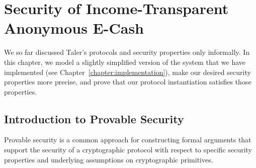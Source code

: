 \chapter{Security of Income-Transparent Anonymous E-Cash}\label{chapter:security}

\def\Z{\mathbb{Z}}

\def\mathperiod{.}
\def\mathcomma{,}

\newcommand*\ST[5]%
{\left#1\,#4\vphantom{#5} \;\right#2 \left. #5 \vphantom{#4}\,\right#3}

\newcommand{\randsel}[0]{\ensuremath{\xleftarrow{\text{\$}}}}

\newcommand{\Exp}[1]{\ensuremath{E\left[#1\right]}}

\newcommand{\ora}[1]{\ensuremath{\mathcal{O}\mathsf{#1}}}
\newcommand{\oraSet}[1]{\ensuremath{\mathcal{O}\textsc{#1}}}
\newcommand{\algo}[1]{\ensuremath{\mathsf{#1}}}
\newcommand{\prt}[1]{\ensuremath{\mathcal{#1}}}
\let\V\relax %
\newcommand{\V}[1]{\ensuremath{\mathsf{#1}}}

\newcommand{\Prb}[1]{\ensuremath{\Pr\left [#1 \right ]}}

\newcommand{\mycomment}[1]{~\\ {\small \textcolor{blue}{({#1})}}}

\theoremstyle{definition}
\newtheorem{definition}{Definition}[section]
\theoremstyle{corollary}
\newtheorem{corollary}{Corollary}[section]


% 

We so far discussed Taler's protocols and security properties only informally.
In this chapter, we model a slightly simplified version of the system that we
have implemented (see Chapter~\ref{chapter:implementation}), make our desired
security properties more precise, and prove that our protocol instantiation
satisfies those properties.

\section{Introduction to Provable Security}
Provable security
\cite{goldwasser1982probabilistic,pointcheval2005provable,shoup2004sequences,coron2000exact} is a common
approach for constructing formal arguments that support the security of a cryptographic
protocol with respect to specific security properties and underlying
assumptions on cryptographic primitives.

